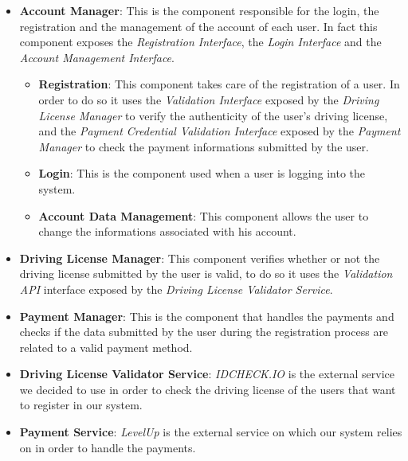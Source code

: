 \begin{itemize}
	\item \textbf{Account Manager}: This is the component responsible for the
																	login, the registration and the management of
																	the account of each user. In fact this component
																	exposes the \textit{Registration Interface},
																	the \textit{Login Interface} and the
																	\textit{Account Management Interface}.
	\begin{itemize}
		\item \textbf{Registration}: This component takes care of the registration
																 of a user. In order to do so it uses the
																 \textit{Validation Interface} exposed by the
																 \textit{Driving License Manager} to verify the
																 authenticity of the user's driving license, and
																 the \textit{Payment Credential Validation Interface}
																 exposed by the \textit{Payment Manager} to
																 check the payment informations submitted by the
																 user.
		\item \textbf{Login}: This is the component used when a user is logging into
													the system.
		\item \textbf{Account Data Management}: This component allows the user to
																						change the informations associated
																						with his account.
	\end{itemize}
	\item \textbf{Driving License Manager}: This component verifies whether or not
	 																				the driving license submitted by the
																					user is valid, to do so it uses the
																					\textit{Validation API} interface
																					exposed by the
																					\textit{Driving License Validator Service}.
	\item \textbf{Payment Manager}: This is the component that handles the
																	payments and checks if the data submitted by
																	the user during the registration process are
																	related to a valid payment method.
	\item \textbf{Driving License Validator Service}: \textit{IDCHECK.IO} is the
																	external service we decided to use in order to
																	check the driving license of the users that
																	want to register in our system.
	\item \textbf{Payment Service}: \textit{LevelUp} is the external service on
																	which our system relies on in order to handle
																	the payments.
\end{itemize}

